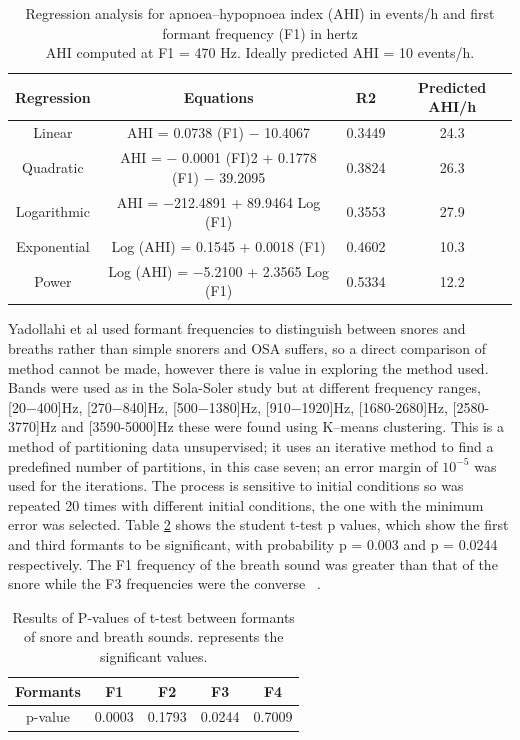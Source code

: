 \begin{table}[h]
\centering
\begin{tabular}{c c c c}
\toprule
Regression&Equations&R2&Predicted AHI/h\\ \midrule
Linear&AHI = 0.0738 (F1) − 10.4067&0.3449&24.3\\ 
Quadratic&AHI = − 0.0001 (FI)2 + 0.1778 (F1) − 39.2095&0.3824&26.3\\ 
Logarithmic&AHI = −212.4891 + 89.9464 Log (F1)&0.3553&27.9\\ 
Exponential&Log (AHI) = 0.1545 + 0.0018 (F1)&0.4602&10.3\\ 
Power&Log (AHI) = −5.2100 + 2.3565 Log (F1)&0.5334&12.2\\ \bottomrule
\end{tabular}
\caption{Regression analysis for apnoea–hypopnoea index (AHI) in events/h and first formant frequency (F1) in hertz \\ AHI computed at F1 = 470 Hz. Ideally predicted AHI = 10 events/h.}
\label{table:ng2008aformantstable2}
\end{table}
Yadollahi et al used formant frequencies to distinguish between snores and breaths rather than simple snorers and OSA suffers, so a direct comparison of method cannot be made, however there is value in exploring the method used. Bands were used as in the Sola-Soler study but at different frequency ranges, [20−400]Hz, [270−840]Hz, [500−1380]Hz, [910−1920]Hz, [1680-2680]Hz, [2580-3770]Hz and [3590-5000]Hz these were found using K–means clustering. This is a method of partitioning data unsupervised; it uses an iterative method to find a predefined number of partitions, in this case seven; an error margin of $10^{−5}$ was used for the iterations. The process is sensitive to initial conditions so was repeated 20 times with different initial conditions, the one with the minimum error was selected. Table \ref{table:yadollahi2009formant} shows the student t-test p values, which show the first and third formants to be significant, with probability p = 0.003 and p = 0.0244 respectively. The F1 frequency of the breath sound was greater than that of the snore while the F3 frequencies were the converse ~\cite{yadollahi2009formant}.

\begin{table}
\centering
\begin{tabular}{c c c c c}
\toprule
Formants&F1&F2&F3&F4\\ \midrule
p-value&0.0003\*&0.1793&0.0244\*&0.7009\\ \bottomrule
\end{tabular}
\caption{Results of P-values of t-test between formants of snore and breath sounds. \* represents the significant values.}
\label{table:yadollahi2009formant}
\end{table}
